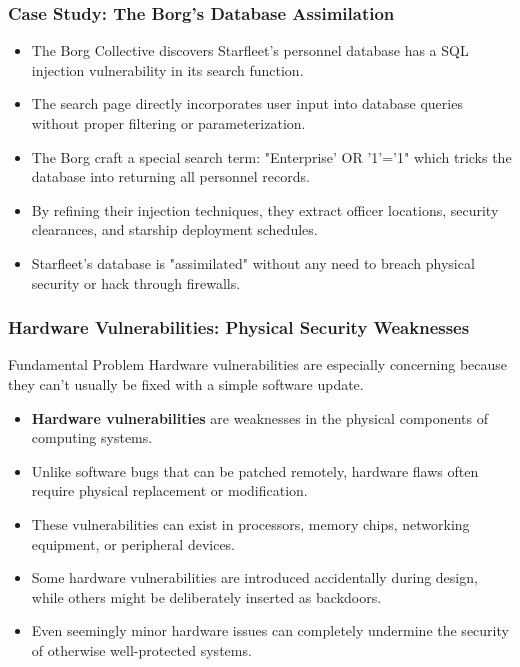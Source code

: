 \documentclass{beamer}
\begin{document}
\begin{frame}
    \frametitle{Case Study: The Borg's Database Assimilation}
    
    \begin{itemize}
        \item The Borg Collective discovers Starfleet's personnel database has a SQL injection vulnerability in its search function.
        \item The search page directly incorporates user input into database queries without proper filtering or parameterization.
        \item The Borg craft a special search term: "Enterprise' OR '1'='1" which tricks the database into returning all personnel records.
        \item By refining their injection techniques, they extract officer locations, security clearances, and starship deployment schedules.
        \item Starfleet's database is "assimilated" without any need to breach physical security or hack through firewalls.
    \end{itemize}
\end{frame}

\begin{frame}
    \frametitle{Hardware Vulnerabilities: Physical Security Weaknesses}
    
    \begin{block}{Fundamental Problem}
        Hardware vulnerabilities are especially concerning because they can't usually be fixed with a simple software update.
    \end{block}
    
    \begin{itemize}
        \item \textbf{Hardware vulnerabilities} are weaknesses in the physical components of computing systems.
        \item Unlike software bugs that can be patched remotely, hardware flaws often require physical replacement or modification.
        \item These vulnerabilities can exist in processors, memory chips, networking equipment, or peripheral devices.
        \item Some hardware vulnerabilities are introduced accidentally during design, while others might be deliberately inserted as backdoors.
        \item Even seemingly minor hardware issues can completely undermine the security of otherwise well-protected systems.
    \end{itemize}
\end{frame}
\end{document}
